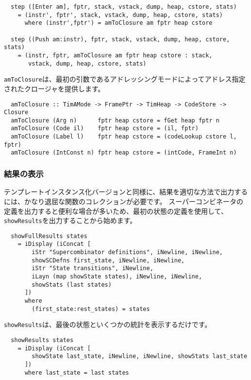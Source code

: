 \documentclass{jarticle}
\begin{document}
\begin{verbatim}
  step ([Enter am], fptr, stack, vstack, dump, heap, cstore, stats)
    = (instr', fptr', stack, vstack, dump, heap, cstore, stats)
      where (instr',fptr') = amToClosure am fptr heap cstore

  step ((Push am:instr), fptr, stack, vstack, dump, heap, cstore, stats)
    = (instr, fptr, amToClosure am fptr heap cstore : stack,
       vstack, dump, heap, cstore, stats)
\end{verbatim}

\texttt{amToClosure}は、最初の引数であるアドレッシングモードによってアドレス指定されたクロージャを提供します。

\begin{verbatim}
  amToClosure :: TimAMode -> FramePtr -> TimHeap -> CodeStore -> Closure
  amToClosure (Arg n)      fptr heap cstore = fGet heap fptr n
  amToClosure (Code il)    fptr heap cstore = (il, fptr)
  amToClosure (Label l)    fptr heap cstore = (codeLookup cstore l, fptr)
  amToClosure (IntConst n) fptr heap cstore = (intCode, FrameInt n)
\end{verbatim}

\subsubsection{結果の表示}

テンプレートインスタンス化バージョンと同様に、結果を適切な方法で出力するには、かなり退屈な関数のコレクションが必要です。
スーパーコンビネータの定義を出力すると便利な場合が多いため、最初の状態の定義を使用して、\texttt{showResults}を出力することから始めます。

\begin{verbatim}
  showFullResults states
    = iDisplay (iConcat [
        iStr "Supercombinator definitions", iNewline, iNewline,
        showSCDefns first_state, iNewline, iNewline,
        iStr "State transitions", iNewline,
        iLayn (map showState states), iNewline, iNewline,
        showStats (last states)
      ])
      where
        (first_state:rest_states) = states
\end{verbatim}

\texttt{showResults}は、最後の状態といくつかの統計を表示するだけです。

\begin{verbatim}
  showResults states
    = iDisplay (iConcat [
        showState last_state, iNewline, iNewline, showStats last_state
      ])
      where last_state = last states
\end{verbatim}
\end{document}
